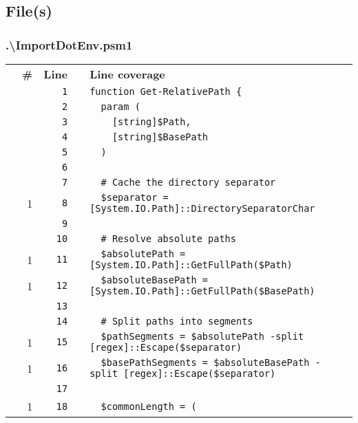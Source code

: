\documentclass[a4paper,landscape,10pt]{article}
\begin{document}
\subsection{File(s)}
\subsubsection{.\textbackslash ImportDotEnv.psm1}
\begin{longtable}[l]{lrrll}
\textbf{} & \textbf{\#} & \textbf{Line} & \textbf{} & \textbf{Line coverage}\\
\cellcolor{gray} &  & \verb~1~ & & \verb~function Get-RelativePath {~\\
\cellcolor{gray} &  & \verb~2~ & & \verb~  param (~\\
\cellcolor{gray} &  & \verb~3~ & & \verb~    [string]$Path,~\\
\cellcolor{gray} &  & \verb~4~ & & \verb~    [string]$BasePath~\\
\cellcolor{gray} &  & \verb~5~ & & \verb~  )~\\
\cellcolor{gray} &  & \verb~6~ & & \verb~~\\
\cellcolor{gray} &  & \verb~7~ & & \verb~  # Cache the directory separator~\\
\cellcolor{green} & 1 & \verb~8~ & & \verb~  $separator = [System.IO.Path]::DirectorySeparatorChar~\\
\cellcolor{gray} &  & \verb~9~ & & \verb~~\\
\cellcolor{gray} &  & \verb~10~ & & \verb~  # Resolve absolute paths~\\
\cellcolor{green} & 1 & \verb~11~ & & \verb~  $absolutePath = [System.IO.Path]::GetFullPath($Path)~\\
\cellcolor{green} & 1 & \verb~12~ & & \verb~  $absoluteBasePath = [System.IO.Path]::GetFullPath($BasePath)~\\
\cellcolor{gray} &  & \verb~13~ & & \verb~~\\
\cellcolor{gray} &  & \verb~14~ & & \verb~  # Split paths into segments~\\
\cellcolor{green} & 1 & \verb~15~ & & \verb~  $pathSegments = $absolutePath -split [regex]::Escape($separator)~\\
\cellcolor{green} & 1 & \verb~16~ & & \verb~  $basePathSegments = $absoluteBasePath -split [regex]::Escape($separator)~\\
\cellcolor{gray} &  & \verb~17~ & & \verb~~\\
\cellcolor{green} & 1 & \verb~18~ & & \verb~  $commonLength = (~\\

\end{longtable}
\end{document}
